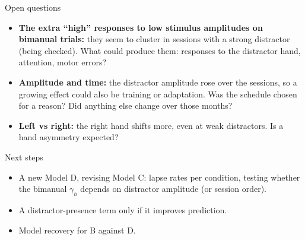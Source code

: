 \begin{frame}{Open questions}
  \begin{itemize}
    \item \textbf{The extra ``high'' responses to low stimulus amplitudes on bimanual trials:} they seem
          to cluster in sessions with a strong distractor (being checked). What could produce
          them: responses to the distractor hand, attention, motor errors?
    \item \textbf{Amplitude and time:} the distractor amplitude rose over the sessions, so a
          growing effect could also be training or adaptation. Was the schedule chosen for a
          reason? Did anything else change over those months?
    \item \textbf{Left vs right:} the right hand shifts more, even at weak distractors. Is a
          hand asymmetry expected?
  \end{itemize}
\end{frame}

\begin{frame}{Next steps}
  \begin{itemize}
    \item A new Model D, revising Model C: lapse rates per condition, testing whether the bimanual
          $\gamma_h$ depends on distractor amplitude (or session order).
    \item A distractor-presence term only if it improves prediction.
    \item Model recovery for B against D.
  \end{itemize}
\end{frame}
